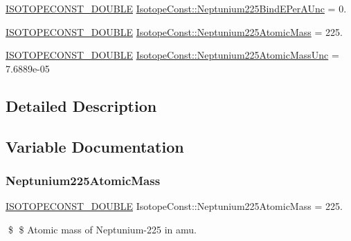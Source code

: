 \begin{DoxyCompactItemize}
\mbox{\hyperlink{group___isotope_const-_macros_ga8f45a7272ce02c0b4c65c44636ed719a}{I\+S\+O\+T\+O\+P\+E\+C\+O\+N\+S\+T\+\_\+\+D\+O\+U\+B\+LE}} \mbox{\hyperlink{group___isotope_const-_neptunium-_np225_ga7c1926d88d4a1a98690c5823deda3338}{Isotope\+Const\+::\+Neptunium225\+Bind\+E\+Per\+A\+Unc}} = 0.
\item 
\mbox{\hyperlink{group___isotope_const-_macros_ga8f45a7272ce02c0b4c65c44636ed719a}{I\+S\+O\+T\+O\+P\+E\+C\+O\+N\+S\+T\+\_\+\+D\+O\+U\+B\+LE}} \mbox{\hyperlink{group___isotope_const-_neptunium-_np225_ga6123c6ce78ec9b638c4dbb88f5952357}{Isotope\+Const\+::\+Neptunium225\+Atomic\+Mass}} = 225.
\item 
\mbox{\hyperlink{group___isotope_const-_macros_ga8f45a7272ce02c0b4c65c44636ed719a}{I\+S\+O\+T\+O\+P\+E\+C\+O\+N\+S\+T\+\_\+\+D\+O\+U\+B\+LE}} \mbox{\hyperlink{group___isotope_const-_neptunium-_np225_gab50ccb730c965b2cfe1ea86706ff039e}{Isotope\+Const\+::\+Neptunium225\+Atomic\+Mass\+Unc}} = 7.\+6889e-\/05
\end{DoxyCompactItemize}


\subsection{Detailed Description}


\subsection{Variable Documentation}
\mbox{\label{group___isotope_const-_neptunium-_np225_ga6123c6ce78ec9b638c4dbb88f5952357}} 
\subsubsection{\texorpdfstring{Neptunium225\+Atomic\+Mass}{Neptunium225AtomicMass}}
{\footnotesize\ttfamily \mbox{\hyperlink{group___isotope_const-_macros_ga8f45a7272ce02c0b4c65c44636ed719a}{I\+S\+O\+T\+O\+P\+E\+C\+O\+N\+S\+T\+\_\+\+D\+O\+U\+B\+LE}} Isotope\+Const\+::\+Neptunium225\+Atomic\+Mass = 225.}

\$ \$ Atomic mass of Neptunium-\/225 in amu. \mbox{\label{group___isotope_const-_neptunium-_np225_gab50ccb730c965b2cfe1ea86706ff039e}} 
